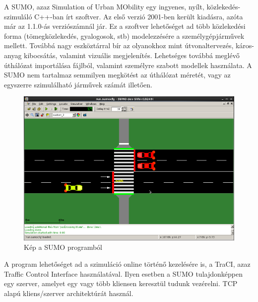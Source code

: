 A SUMO, azaz Simulation of Urban MObility egy ingyenes, nyílt, közlekedés-szimuláló C++-ban írt szoftver. Az első verzió 2001-ben került kiadásra, azóta már az 1.1.0-ás verziószámnál jár. Ez a szoftver lehetőséget ad több közlekedési forma (tömegközlekedés, gyalogosok, stb)
modelezzésére a személygépjárművek mellett. Továbbá nagy eszköztárral bír az olyanokhoz mint útvonaltervezés, káros-anyag kibocsátás, valamint vizuális megjelenítés.
Lehetséges továbbá meglévő úthálózat importálása fájlból, valamint személyre szabott modellek használata. A SUMO nem tartalmaz semmilyen megkötést az úthálózat méretét, vagy az egyszerre szimulálható járművek számát illetően.
\begin{figure}[H]
\includegraphics[width=\linewidth]{SUMO.png}
\caption{Kép a SUMO programból}
\label{fig:SUMO}
\end{figure}

A program lehetőséget ad a szimuláció online történő kezelésére is, a TraCI, azaz Traffic Control Interface használatával. Ilyen esetben a SUMO tulajdonképpen egy szerver, amelyet
egy vagy több kliensen keresztül tudunk vezérelni. TCP alapú kliens/szerver architektúrát használ. 

